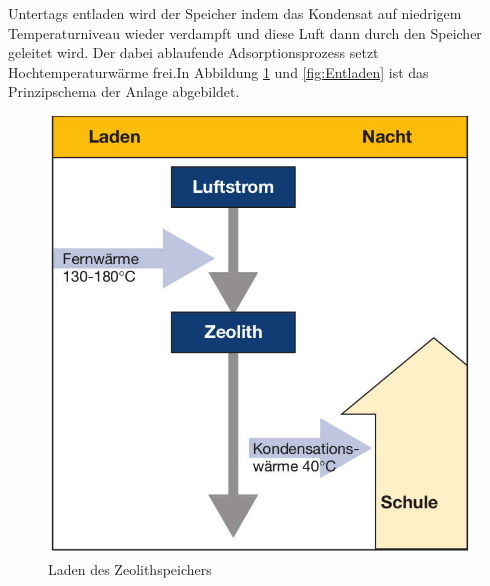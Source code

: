 \documentclass[11pt,a4paper]{scrartcl}
\begin{document}
Untertags entladen wird der Speicher indem das Kondensat auf niedrigem
Temperaturniveau wieder verdampft und diese Luft dann durch den Speicher
geleitet wird. Der dabei ablaufende Adsorptionsprozess setzt Hochtemperaturwärme
frei.In Abbildung \ref{fig:Laden} und \ref{fig:Entladen} ist das Prinzipschema
der Anlage abgebildet.

\begin{figure}[h!]
\begin{center}
\includegraphics[scale=1]{images/Laden.jpg}
\caption{Laden des Zeolithspeichers \cite{BINE2}}
\label{fig:Laden}
\end{center}
\end{figure}
\end{document}
